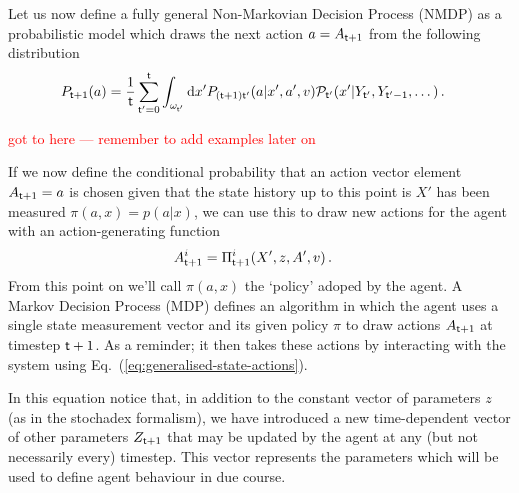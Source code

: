 Let us now define a fully general Non-Markovian Decision Process (NMDP) as a probabilistic model which draws the next action $a=A_{{\sf t}+1}$ from the following distribution
\begin{align}
P_{{\sf t}+1}(a) &= \frac{1}{{\sf t}}\sum_{{\sf t}'=0}^{{\sf t}}\int_{\omega_{{\sf t}'}} {\rm d}x'P_{({\sf t}+1){\sf t}'}(a\vert x',a',v){\cal P}_{{\sf t}'}(x'\vert Y_{{\sf t}'}, Y_{{\sf t}'-1}, \dots) \,.
\end{align}

\textcolor{red}{
got to here --- remember to add examples later on
}

If we now define the conditional probability that an action vector element $A_{{\sf t}+1}=a$ is chosen given that the state history up to this point is $X'$ has been measured $\pi (a,x) = p(a\vert x)$, we can use this to draw new actions for the agent with an action-generating function
\begin{align}
A_{{\sf t}+1}^i &= \Pi_{{\sf t}+1}^i(X', z, A', v) \label{eq:action-generating-function} \,.
\end{align}
From this point on we'll call $\pi (a,x)$ the `policy' adoped by the agent. A Markov Decision Process (MDP) defines an algorithm in which the agent uses a single state measurement vector and its given policy $\pi$ to draw actions $A_{{\sf t}+1}$ at timestep ${{\sf t}+1}$. As a reminder; it then takes these actions by interacting with the system using Eq.~(\ref{eq:generalised-state-actions}).

In this equation notice that, in addition to the constant vector of parameters $z$ (as in the stochadex formalism), we have introduced a new time-dependent vector of other parameters $Z_{{\sf t}+1}$ that may be updated by the agent at any (but not necessarily every) timestep. This vector represents the parameters which will be used to define agent behaviour in due course.